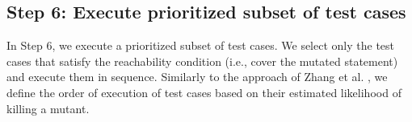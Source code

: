 %
%
%

\subsection{Step 6: Execute prioritized subset of test cases}
\label{sec:step:prioritize}

In Step 6, we execute a prioritized subset of test cases. 
We select only the test cases that satisfy 
the reachability condition (i.e., cover the mutated statement) and  execute them in sequence.
Similarly to the approach of Zhang et al. \cite{zhang2013faster}, we define the order of execution of test cases based on their estimated likelihood of killing a mutant.
 

